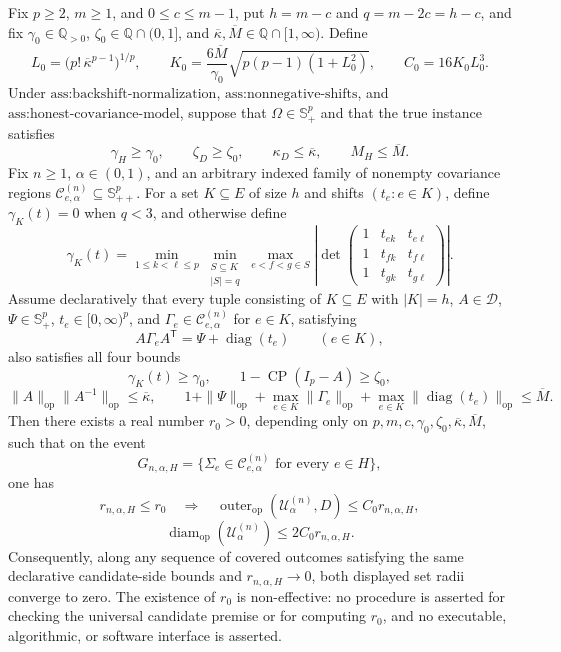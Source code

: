 Fix \(p\geq2\), \(m\geq1\), and \(0\leq c\leq m-1\), put \(h=m-c\) and \(q=m-2c=h-c\), and fix \(\gamma_0\in\mathbb Q_{>0}\), \(\zeta_0\in\mathbb Q\cap(0,1]\), and \(\overline\kappa,\overline M\in\mathbb Q\cap[1,\infty)\). Define
\[
L_0=\bigl(p!\,\overline\kappa^{p-1}\bigr)^{1/p},
\qquad
K_0=\frac{6\overline M}{\gamma_0}
\sqrt{p(p-1)(1+L_0^2)},
\qquad
C_0=16K_0L_0^3.
\]
Under \(\text{ass:backshift-normalization}\), \(\text{ass:nonnegative-shifts}\), and \(\text{ass:honest-covariance-model}\), suppose that \(\Omega\in\mathbb S_+^p\) and that the true instance satisfies
\[
\gamma_H\geq\gamma_0,\qquad
\zeta_D\geq\zeta_0,\qquad
\kappa_D\leq\overline\kappa,\qquad
M_H\leq\overline M.
\]
Fix \(n\geq1\), \(\alpha\in(0,1)\), and an arbitrary indexed family of nonempty covariance regions \(\mathcal C^{(n)}_{e,\alpha}\subseteq\mathbb S_{++}^p\). For a set \(K\subseteq E\) of size \(h\) and shifts \((t_e:e\in K)\), define \(\gamma_K(t)=0\) when \(q<3\), and otherwise define
\[
\gamma_K(t)=
\min_{1\leq k<\ell\leq p}
\min_{\substack{S\subseteq K\\|S|=q}}
\max_{e<f<g\in S}
\left|
\det\begin{pmatrix}
1&t_{ek}&t_{e\ell}\\
1&t_{fk}&t_{f\ell}\\
1&t_{gk}&t_{g\ell}
\end{pmatrix}
\right|.
\]
Assume declaratively that every tuple consisting of \(K\subseteq E\) with \(|K|=h\), \(A\in\mathcal D\), \(\Psi\in\mathbb S_+^p\), \(t_e\in[0,\infty)^p\), and \(\Gamma_e\in\mathcal C^{(n)}_{e,\alpha}\) for \(e\in K\), satisfying
\[
A\Gamma_eA^{\mathsf T}=\Psi+\operatorname{diag}(t_e)
\qquad(e\in K),
\]
also satisfies all four bounds
\[
\gamma_K(t)\geq\gamma_0,\qquad
1-\operatorname{CP}(I_p-A)\geq\zeta_0,
\]
\[
\|A\|_{\mathrm{op}}\|A^{-1}\|_{\mathrm{op}}
\leq\overline\kappa,\qquad
1+\|\Psi\|_{\mathrm{op}}
+\max_{e\in K}\|\Gamma_e\|_{\mathrm{op}}
+\max_{e\in K}\|\operatorname{diag}(t_e)\|_{\mathrm{op}}
\leq\overline M.
\]
Then there exists a real number \(r_0>0\), depending only on \(p,m,c,\gamma_0,\zeta_0,\overline\kappa,\overline M\), such that on the event
\[
G_{n,\alpha,H}
=\{\Sigma_e\in\mathcal C^{(n)}_{e,\alpha}\text{ for every }e\in H\},
\]
one has
\[
r_{n,\alpha,H}\leq r_0
\quad\Longrightarrow\quad
\operatorname{outer}_{\mathrm{op}}(\mathcal U^{(n)}_\alpha,D)
\leq C_0r_{n,\alpha,H},
\]
\[
\operatorname{diam}_{\mathrm{op}}(\mathcal U^{(n)}_\alpha)
\leq2C_0r_{n,\alpha,H}.
\]
Consequently, along any sequence of covered outcomes satisfying the same declarative candidate-side bounds and \(r_{n,\alpha,H}\to0\), both displayed set radii converge to zero. The existence of \(r_0\) is non-effective: no procedure is asserted for checking the universal candidate premise or for computing \(r_0\), and no executable, algorithmic, or software interface is asserted.